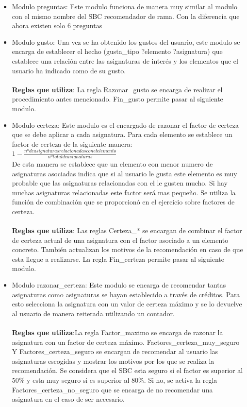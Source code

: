 \begin{itemize}
   \item Modulo preguntas: Este modulo funciona de manera muy similar al modulo con el mismo nombre del SBC recomendador de rama. Con la diferencia que ahora existen solo 6 preguntas

   \item Modulo gusto: Una vez se ha obtenido los gustos del usuario, este modulo se encarga de establecer el hecho (gusta\_tipo ?elemento ?asignatura) que establece una relación entre las asignaturas de interés y los elementos que el usuario ha indicado como de su gusto.
   \\\\
   \textbf{Reglas que utiliza}: La regla Razonar\_gusto se encarga de realizar el procedimiento antes mencionado. Fin\_gusto permite pasar al siguiente modulo.

   \item Modulo certeza: Este modulo es el encargado de razonar el factor de certeza que se debe aplicar a cada asignatura. Para cada elemento se establece un factor de certeza de la siguiente manera: \\$1 - \frac{nº de asignaturas relacionadas con el elemento}{nº total de asignaturas}$\\ De esta manera se establece que un elemento con menor numero de asignaturas asociadas indica que si al usuario le gusta este elemento es muy probable que las asignaturas relacionadas con el le gusten mucho. Si hay muchas asignaturas relacionadas este factor será mas pequeño. Se utiliza la función de combinación que se proporcionó en el ejercicio sobre factores de certeza.
   \\\\
   \textbf{Reglas que utiliza}: Las reglas Certeza\_* se encargan de combinar el factor de certeza actual de una asignatura con el factor asociado a un elemento concreto. También actualizan los motivos de la recomendación en caso de que esta llegue a realizarse. La regla Fin\_certeza permite pasar al siguiente modulo.

   \item Modulo razonar\_certeza: Este modulo se encarga de recomendar tantas asignaturas como asignaturas se hayan establecido a través de créditos. Para esto selecciona la asignatura con un valor de certeza máximo y se lo devuelve al usuario de manera reiterada utilizando un contador.
   \\\\
   \textbf{Reglas que utiliza}:La regla Factor\_maximo se encarga de razonar la asignatura con un factor de certeza máximo. Factores\_certeza\_muy\_seguro Y Factores\_certeza\_seguro se encargan de recomendar al usuario las asignaturas escogidas y mostrar los motivos por los que se realiza la recomendación. Se considera que el SBC esta seguro si el factor es superior al 50\% y esta muy seguro si es superior al 80\%. Si no, se activa la regla Factores\_certeza\_no\_seguro que se encarga de no recomendar una asignatura en el caso de ser necesario.

\end{itemize}


